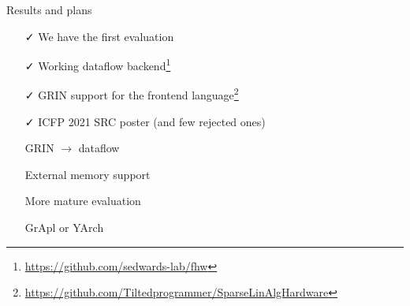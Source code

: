 \documentclass[xcolor=table]{beamer}
\begin{document}
\begin{frame}{Results and plans}
    \begin{itemize}
        \item[\faCheck] We have the first evaluation
        \vfill
        \item[\faCheck] Working dataflow backend\footnote{\url{https://github.com/sedwards-lab/fhw}}
        \vfill
        \item[\faCheck] GRIN support for the frontend language\footnote{\url{https://github.com/Tiltedprogrammer/SparseLinAlgHardware}}
        \vfill
        \item[\faCheck] ICFP 2021 SRC poster (and few rejected ones)
        \vfill
        \item[\faGear] GRIN $\to$ dataflow
        \vfill
        \item[\faGear] External memory support
        \vfill
        \item[\faGear] More mature evaluation
        \vfill
        \item[\faGear] GrApl or YArch
    \end{itemize}
\end{frame}


\end{document}

